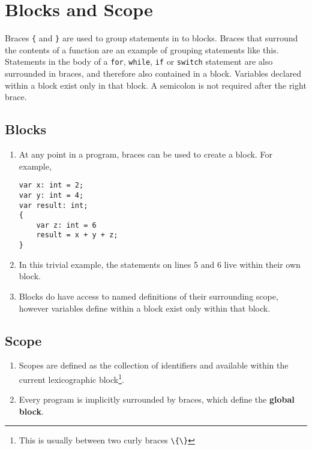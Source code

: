 \section{Blocks and Scope}
Braces  \lstinline|{| and \lstinline|}| are used to group statements in to blocks. Braces that surround the contents of a function are an example of grouping statements like this. Statements in the body of a \lstinline|for|, \lstinline|while|, \lstinline|if| or \lstinline|switch| statement are also  surrounded in braces, and therefore also contained in a block. Variables declared within a block exist only in that block. A semicolon is not required after the right brace. 

\subsection{Blocks}
\label{subsec:blocks}
\begin{enumerate}
	\item At any point in a program, braces can be used to create a block. For example,
\begin{lstlisting}[numbers=none]
var x: int = 2;
var y: int = 4;
var result: int;
{
	var z: int = 6
	result = x + y + z;
}
\end{lstlisting}
	\item In this trivial example, the statements on lines 5 and 6 live within their own block.
	\item Blocks do have access to named definitions of their surrounding scope, however variables define within a block exist only within that block.
\end{enumerate}

\subsection{Scope}
\begin{enumerate}
	\item Scopes are defined as the collection of identifiers and available within the current lexicographic block\footnote{This is usually between two curly braces \lstinline|\{\}|}.
	\item Every program is implicitly surrounded by braces, which define the \textbf{global block}.
\end{enumerate}

